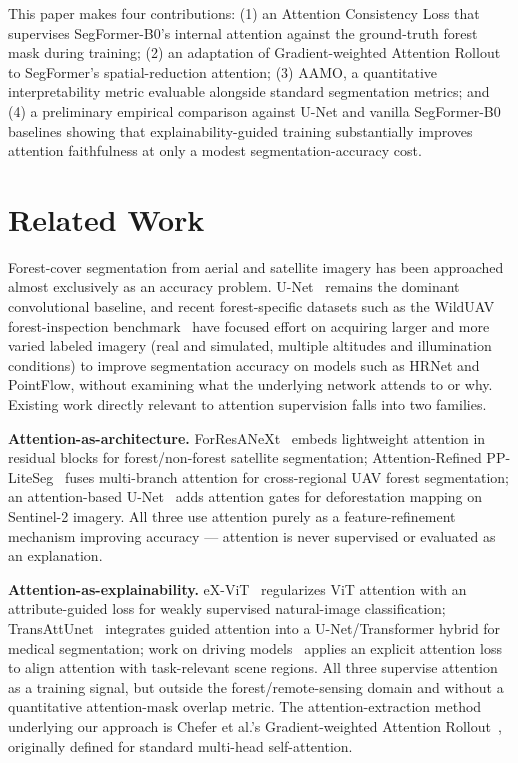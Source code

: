 \documentclass[sigconf,review]{acmart}
\begin{document}
This paper makes four contributions: (1) an Attention Consistency Loss that
supervises SegFormer-B0's internal attention against the ground-truth
forest mask during training; (2) an adaptation of Gradient-weighted
Attention Rollout to SegFormer's spatial-reduction attention; (3) AAMO, a
quantitative interpretability metric evaluable alongside standard
segmentation metrics; and (4) a preliminary empirical comparison against
U-Net and vanilla SegFormer-B0 baselines showing that explainability-guided
training substantially improves attention faithfulness at only a modest
segmentation-accuracy cost.

\section{Related Work}

Forest-cover segmentation from aerial and satellite imagery has been
approached almost exclusively as an accuracy problem. U-Net~\cite{ronneberger2015unet}
remains the dominant convolutional baseline, and recent forest-specific
datasets such as the WildUAV forest-inspection
benchmark~\cite{blaga2024wilduav} have focused effort on acquiring larger
and more varied labeled imagery (real and simulated, multiple altitudes and
illumination conditions) to improve segmentation accuracy on models such as
HRNet and PointFlow, without examining what the underlying network attends
to or why. Existing work directly relevant to attention supervision falls
into two families.

\textbf{Attention-as-architecture.} ForResANeXt~\cite{foresanext2026} embeds
lightweight attention in residual blocks for forest/non-forest satellite
segmentation; Attention-Refined PP-LiteSeg~\cite{ppliteseg2026} fuses
multi-branch attention for cross-regional UAV forest segmentation; an
attention-based U-Net~\cite{attunet2022deforestation} adds attention gates
for deforestation mapping on Sentinel-2 imagery. All three use attention
purely as a feature-refinement mechanism improving accuracy --- attention is
never supervised or evaluated as an explanation.

\textbf{Attention-as-explainability.} eX-ViT~\cite{zhang2023exvit}
regularizes ViT attention with an attribute-guided loss for weakly
supervised natural-image classification; TransAttUnet~\cite{chen2022transattunet}
integrates guided attention into a U-Net/Transformer hybrid for medical
segmentation; work on driving models~\cite{guiding2024driving} applies an
explicit attention loss to align attention with task-relevant scene regions.
All three supervise attention as a training signal, but outside the
forest/remote-sensing domain and without a quantitative attention-mask
overlap metric. The attention-extraction method underlying our approach is
Chefer et al.'s Gradient-weighted Attention
Rollout~\cite{chefer2021transformer}, originally defined for standard
multi-head self-attention.
\end{document}
